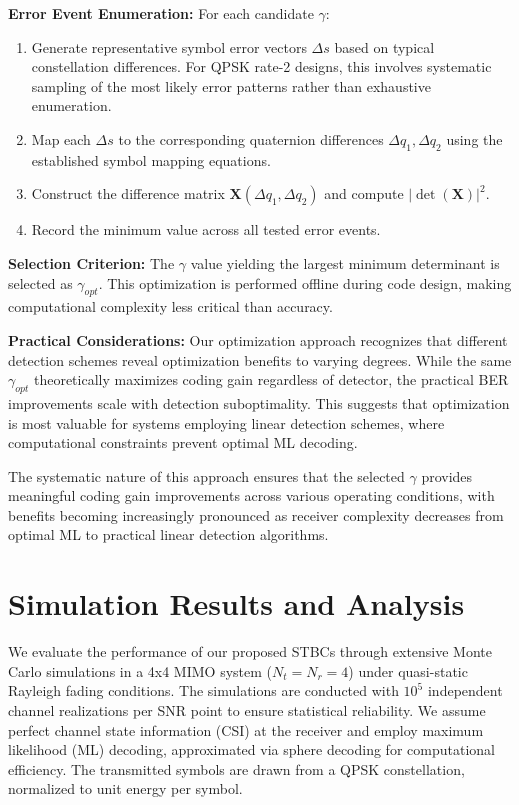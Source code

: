 \documentclass[twocolumn,conference]{IEEEtran}
\begin{document}
\textbf{Error Event Enumeration:} For each candidate $\gamma$:
\begin{enumerate}
    \item Generate representative symbol error vectors $\Delta s$ based on typical constellation differences. 
    For QPSK rate-2 designs, this involves systematic sampling of the most likely error patterns rather than exhaustive enumeration.
    
    \item Map each $\Delta s$ to the corresponding quaternion differences $\Delta q_1, \Delta q_2$ using the established symbol mapping equations.
    
    \item Construct the difference matrix $\mathbf{X}(\Delta q_1, \Delta q_2)$ and compute $|\det(\mathbf{X})|^2$.
    
    \item Record the minimum value across all tested error events.
\end{enumerate}

\textbf{Selection Criterion:} The $\gamma$ value yielding the largest minimum determinant is selected as $\gamma_{opt}$. 
This optimization is performed offline during code design, making computational complexity less critical than accuracy.

\textbf{Practical Considerations:} Our optimization approach recognizes that different detection schemes reveal optimization benefits to varying degrees. 
While the same $\gamma_{opt}$ theoretically maximizes coding gain regardless of detector, the practical BER improvements scale with detection suboptimality. 
This suggests that optimization is most valuable for systems employing linear detection schemes, where computational constraints prevent optimal ML decoding.

The systematic nature of this approach ensures that the selected $\gamma$ provides meaningful coding gain improvements across various operating conditions, with benefits becoming increasingly pronounced as receiver complexity decreases from optimal ML to practical linear detection algorithms.

\section{Simulation Results and Analysis}
We evaluate the performance of our proposed STBCs through extensive Monte Carlo simulations in a 4x4 MIMO system (\(N_t = N_r = 4\)) under quasi-static Rayleigh fading conditions. The simulations are conducted with \(10^5\) independent channel realizations per SNR point to ensure statistical reliability. We assume perfect channel state information (CSI) at the receiver and employ maximum likelihood (ML) decoding, approximated via sphere decoding for computational efficiency. The transmitted symbols are drawn from a QPSK constellation, normalized to unit energy per symbol.
\end{document}
